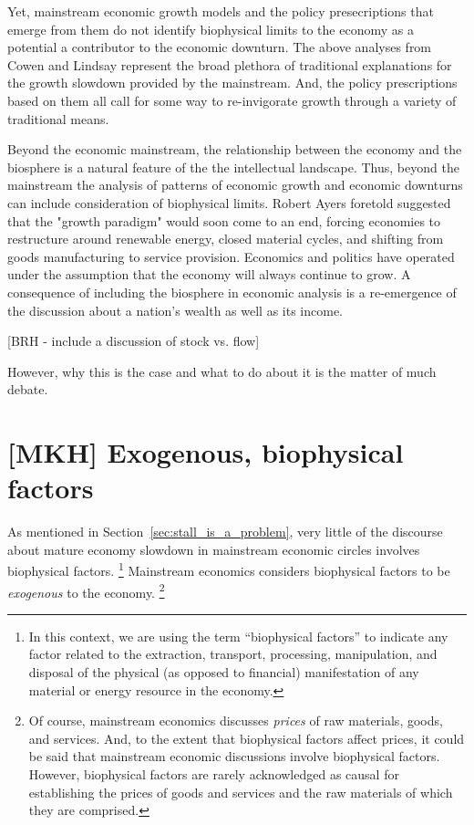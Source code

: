 Yet, mainstream economic growth models and the policy presecriptions that emerge from them do not identify biophysical limits to the economy as a potential a contributor to the economic downturn. The above analyses from Cowen and Lindsay represent the broad plethora of traditional explanations for the growth slowdown provided by the mainstream. And, the policy prescriptions based on them all call for some way to re-invigorate growth through a variety of traditional means. 

Beyond the economic mainstream, the relationship between the economy and the biosphere is a natural feature of the the intellectual landscape. Thus, beyond the mainstream the analysis of patterns of economic growth and economic downturns can include consideration of biophysical limits. Robert Ayers foretold suggested that the "growth paradigm" would soon come to an end, forcing economies to restructure around renewable energy, closed material cycles, and shifting from goods manufacturing to service provision.\cite{ayers1998} Economics and politics have operated under the assumption that the economy will always continue to grow. A consequence of including the biosphere in economic analysis is a re-emergence of the discussion about a nation's wealth as well as its income. 

[BRH - include a discussion of stock vs. flow]


However, why this is the case and what to do about it is the matter of much debate. 


\section{[MKH] Exogenous, biophysical factors}
\label{sec:exogenous_factors}

As mentioned in Section~\ref{sec:stall_is_a_problem}, 
very little of the discourse 
about mature economy slowdown 
in mainstream economic circles
involves biophysical factors.%
	\footnote{
	In this context, we are using the term ``biophysical factors''
	to indicate any factor related to 
	the extraction, transport, processing, manipulation, and disposal 
	of the physical (as opposed to financial) manifestation 
	of any material or energy resource in the economy.
	}
Mainstream economics considers biophysical factors
to be \emph{exogenous} to the economy.%
	\footnote{
	Of course, mainstream economics discusses \emph{prices}
	of raw materials, goods, and services. 
	And, to the extent that biophysical factors affect prices,
	it could be said that mainstream economic discussions involve
	biophysical factors.
	However, biophysical factors are rarely acknowledged as causal 
	for establishing the prices of goods and services and the raw materials 
	of which they are comprised.
	}

